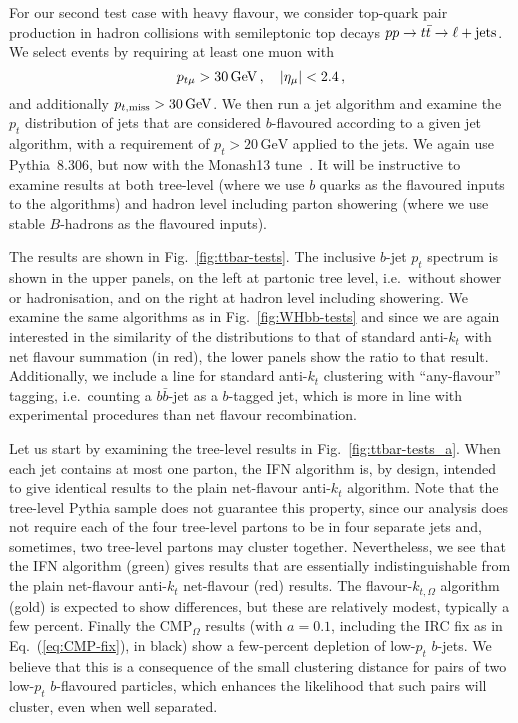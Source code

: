 \documentclass[nofootinbib,twocolumn,preprintnumbers,superscriptaddress,aps]{revtex4-2}
\newcommand{\GeV}{\,\text{GeV}}
\begin{document}
For our second test case with heavy flavour, we consider top-quark
pair production in hadron collisions with semileptonic top decays
$pp \to t\bar t \to \ell + {\rm jets}$.
%
We select events by requiring at least one muon with
%
\begin{equation}
p_{t\mu} > 30 {\,\rm GeV}\,,\quad |\eta_{\mu}| < 2.4\,,
\end{equation}
%
and additionally $p_{t,{\rm miss}} > 30 {\,\rm GeV}$.
%
We then run a jet algorithm and examine the $p_t$ distribution of jets
that are considered $b$-flavoured according to a given jet algorithm,
with a requirement of $p_t > 20\GeV$ applied to the jets.
%
We again use Pythia~8.306, but now with the Monash13
tune~\cite{Skands:2014pea}.
%
It will be instructive to examine results
at both tree-level (where we use $b$ quarks as the flavoured inputs to
the algorithms) and hadron level including parton showering (where we
use stable $B$-hadrons as the flavoured inputs).


The results are shown in Fig.~\ref{fig:ttbar-tests}. 
%
The inclusive $b$-jet $p_t$ spectrum is shown in the upper panels,
on the left at partonic tree level, i.e.\ without shower or
hadronisation, and on the right at hadron level including showering.
%
We examine the same algorithms as in Fig.~\ref{fig:WHbb-tests}
and since we are again interested in the similarity of the distributions to
that of standard anti-$k_t$ with net flavour summation (in red), the
lower panels show the ratio to that result.
%
Additionally, we include a line for standard anti-$k_t$
clustering with ``any-flavour'' tagging, i.e.\ counting a
$b\bar b$-jet as a $b$-tagged jet, which is more in line with
experimental procedures than net flavour recombination.
%


Let us start by examining the tree-level results in Fig.~\ref{fig:ttbar-tests_a}.
%
When each jet contains at most one parton, the IFN algorithm is, by
design, intended to give identical results to the plain net-flavour
anti-$k_t$ algorithm.
%
Note that the tree-level Pythia sample does not guarantee this
property, since our analysis does not require each of the four
tree-level partons to be in four separate jets and, sometimes, two
tree-level partons may cluster together.
%
Nevertheless, we see that the IFN algorithm (green) gives results that
are essentially indistinguishable from the plain net-flavour
anti-$k_t$ net-flavour (red) results.
%
The flavour-$k_{t,\Omega}$ algorithm (gold) is expected to show differences,
but these are relatively modest, typically a few percent.
%
Finally the CMP$_\Omega$ results (with $a=0.1$, including the IRC fix as
in Eq.~(\ref{eq:CMP-fix}), in black) show a few-percent depletion of
low-$p_t$ $b$-jets.
%
We believe that this is a consequence of the small clustering distance
for pairs of two low-$p_t$ $b$-flavoured particles, which enhances the
likelihood that such pairs will cluster, even when well separated.
\end{document}

